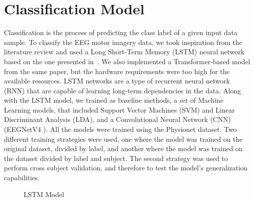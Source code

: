 \section{Classification Model}
Classification is the process of predicting the class label of a given input data sample.
To classify the EEG motor imagery data, we took inspiration from the literature review and used a Long Short-Term Memory (LSTM) neural network based on the one presented in~\cite{sharma_deep_2023}.
We also implemented a Transformer-based model from the same paper, but the hardware requirements were too high for the available resources.
LSTM networks are a type of recurrent neural network (RNN) that are capable of learning long-term dependencies in the data.
Along with the LSTM model, we trained as baseline methods, a set of Machine Learning models, that included Support Vector Machines (SVM) and Linear Discriminant Analysis (LDA), and a Convolutional Neural Network (CNN) (EEGNetV4 \cite{lawhern2018eegnet}).
All the models were trained using the Physionet dataset. 
Two different training strategies were used, one where the model was trained on the original dataset, divided by label, and another where the model was trained on the dataset divided by label and subject.
The second strategy was used to perform cross subject validation, and therefore to test the model's generalization capabilities.
\begin{figure}[!htbp]
    \centering
    \caption{LSTM Model}
    \label{fig:lstm}
\end{figure}

